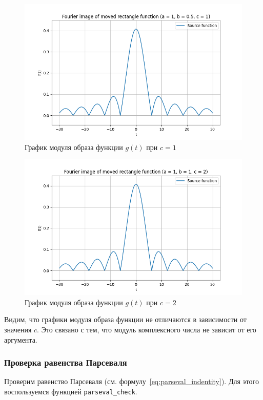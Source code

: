 \begin{figure}[ht!]
    \centering
    \includegraphics[width=\textwidth]{media/moved_rectangle_2_image_abs.png}
    \caption{График модуля образа функции $g(t)$ при $c = 1$}
    \label{fig:moved_rectangle_2_image_abs}
\end{figure}

\begin{figure}[ht!]
    \centering
    \includegraphics[width=\textwidth]{media/moved_rectangle_3_image_abs.png}
    \caption{График модуля образа функции $g(t)$ при $c = 2$}
    \label{fig:moved_rectangle_3_image_abs}
\end{figure}

Видим, что графики модуля образа функции не отличаются в зависимости от значения $c$. Это связано с тем, что модуль комплексного числа не зависит от его аргумента.

\FloatBarrier

\subsubsection{Проверка равенства Парсеваля}
Проверим равенство Парсеваля (см. формулу~\eqref{eq:parseval_indentity}). Для этого воспользуемся функцией \texttt{parseval\_check}. 

